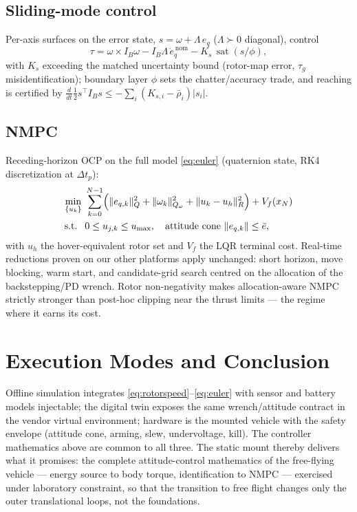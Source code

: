 \documentclass[conference]{IEEEtran}
\newcommand{\sat}{\operatorname{sat}}
\begin{document}
\subsection{Sliding-mode control}
Per-axis surfaces on the error state, $s = \omega + \Lambda\,e_q$ ($\Lambda\succ0$ diagonal), control
\begin{equation}
\tau = \omega\times I_B\omega - I_B\Lambda\,\dot e_q^{\,\mathrm{nom}} - K_s\,\sat(s/\phi),
\end{equation}
with $K_s$ exceeding the matched uncertainty bound (rotor-map error, $\tau_g$ misidentification); boundary layer $\phi$ sets the chatter/accuracy trade, and reaching is certified by $\tfrac{d}{dt}\tfrac12 s^{\!\top}I_B s \le -\sum_i(K_{s,i} - \bar\rho_i)|s_i|$.

\subsection{NMPC}
Receding-horizon OCP on the full model \eqref{eq:euler} (quaternion state, RK4 discretization at $\Delta t_p$):
\begin{align}
\min_{\{u_k\}}\ &\sum_{k=0}^{N-1}\Bigl( \|e_{q,k}\|_Q^2 + \|\omega_k\|_{Q_\omega}^2 + \|u_k - u_h\|_R^2 \Bigr) + V_f(x_N)\nonumber\\
\text{s.t. }\ & 0 \le u_{j,k} \le u_{\max},\quad \text{attitude cone } \|e_{q,k}\|\le\bar e,
\end{align}
with $u_h$ the hover-equivalent rotor set and $V_f$ the LQR terminal cost. Real-time reductions proven on our other platforms apply unchanged: short horizon, move blocking, warm start, and candidate-grid search centred on the allocation of the backstepping/PD wrench. Rotor non-negativity makes allocation-aware NMPC strictly stronger than post-hoc clipping near the thrust limits --- the regime where it earns its cost.

\section{Execution Modes and Conclusion}
Offline simulation integrates \eqref{eq:rotorspeed}--\eqref{eq:euler} with sensor and battery models injectable; the digital twin exposes the same wrench/attitude contract in the vendor virtual environment; hardware is the mounted vehicle with the safety envelope (attitude cone, arming, slew, undervoltage, kill). The controller mathematics above are common to all three. The static mount thereby delivers what it promises: the complete attitude-control mathematics of the free-flying vehicle --- energy source to body torque, identification to NMPC --- exercised under laboratory constraint, so that the transition to free flight changes only the outer translational loops, not the foundations.
\end{document}
